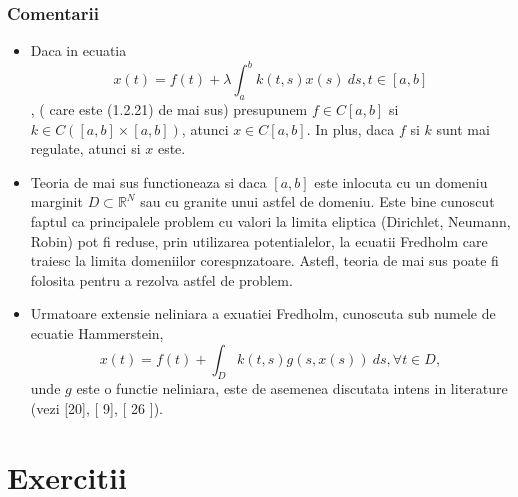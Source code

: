 \documentclass[a4paper,12pt,oneside]{report}
\begin{document}
	\subsection{Comentarii}
					
	\begin{itemize}
		\item Daca in ecuatia \begin{displaymath} x\left ( t \right ) = f\left ( t  \right ) + \lambda \int_{a}^{b}k\left ( t,s \right )x\left ( s \right )\ ds, t \in \left [ a,b \right ] \end{displaymath}, ( care este (1.2.21) de mai sus) presupunem \(f\in C\left [ a,b \right ]\) si \(k\in  C\left (\left [ a,b \right ] \times \left [ a,b \right ] \right )\), atunci \(x\in C\left [ a,b \right ]\). In plus, daca \(f\) si \(k\) sunt mai regulate, atunci si \(x\) este. 
		      		      		      		      		          
		\item Teoria de mai sus functioneaza si daca \(\left [ a,b \right ]\) este inlocuta cu un domeniu marginit \(D\subset \mathbb{R}^{N}\) sau cu granite unui astfel de domeniu. Este bine cunoscut faptul ca principalele problem cu valori la limita eliptica (Dirichlet, Neumann, Robin) pot fi reduse, prin utilizarea potentialelor, la ecuatii Fredholm care traiesc la limita domeniilor corespnzatoare. Astefl, teoria de mai sus poate fi folosita pentru a rezolva astfel de problem. 
		      		      		      		      		          
		\item Urmatoare extensie neliniara a exuatiei Fredholm, cunoscuta sub numele de ecuatie Hammerstein, \begin{displaymath} x\left ( t \right ) = f\left ( t \right ) + \int_{D}k\left ( t,s \right )g\left ( s,x\left ( s \right ) \right ) \ ds, \forall t\in D, \end{displaymath} unde \(g\) este o functie neliniara, este de asemenea discutata intens in literature (vezi [20], [ 9], [ 26 ]). 
	\end{itemize}
					
	\chapter{Exercitii}
					
\end{document}
